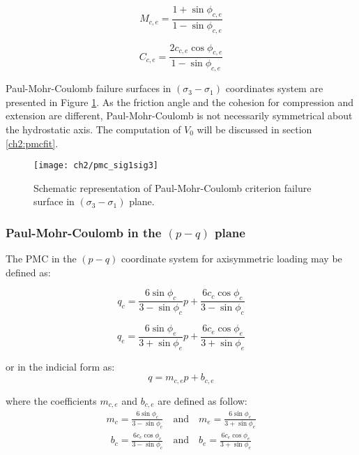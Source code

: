 \begin{equation}\label{eq2:PMC_sig1sig3_Mce}
    M_{c,e} = \frac{1+\sin \phi_{c,e}}{1-\sin \phi_{c,e}}
\end{equation}

\begin{equation}\label{eq2:PMC_sig1sig3_Cce}
    C_{c,e} = \frac{2c_{c,e}\cos \phi_{c,e}}{1-\sin \phi_{c,e}}
\end{equation}

Paul-Mohr-Coulomb failure surfaces in $(\sigma_3 -\sigma_1)$ coordinates system are presented in Figure \ref{fig2:pmc_sig1sig3}. As the friction angle and the cohesion for compression and extension are different, Paul-Mohr-Coulomb is not necessarily symmetrical about the hydrostatic axis. The computation of $V_0$ will be discussed in section \ref{ch2:pmcfit}. 

\begin{figure}[tb]
    \centering
    \texttt{[image: ch2/pmc\_sig1sig3]}
    \caption{Schematic representation of Paul-Mohr-Coulomb criterion failure surface in $(\sigma_3 -\sigma_1)$ plane.}
    \label{fig2:pmc_sig1sig3}
\end{figure} 

\subsubsection{Paul-Mohr-Coulomb in the \texorpdfstring{$(p-q)$}{p-q} plane}

The PMC in the $(p-q)$ coordinate system for axisymmetric loading may be defined as:

\begin{equation}\label{eq2:pmc-q-CTC}
    q_c=\frac{6 \sin \phi_{c}}{3-\sin \phi_{c}} p+\frac{6 c_{c} \cos \phi_{c}}{3-\sin \phi_{c}}
\end{equation}

\begin{equation}\label{eq2:pmc-q-CTE}
    q_e=\frac{6 \sin \phi_{e}}{3+\sin \phi_{e}} p+\frac{6 c_{e} \cos  \phi_{e}}{3+\sin \phi_{e}}
\end{equation}

or in the indicial form as:
\begin{equation}\label{eq2:PMC_pq}
    q = m_{c,e}p+b_{c,e}
\end{equation}

where the coefficients $m_{c,e}$ and $b_{c,e}$ are defined as follow:
\begin{align}\label{eq2:pmc_m_pq}
    m_c=\frac{6 \sin \phi_{c}}{3-\sin \phi_{c}} \quad \textrm{and} \quad m_e=\frac{6 \sin \phi_{e}}{3+\sin \phi_{e}} 
\end{align}
\begin{align}\label{eq2:pmc_b_pq}
    b_c=\frac{6 c_{c} \cos \phi_{c}}{3-\sin \phi_{c}}\quad \textrm{and} \quad b_e=\frac{6 c_{e} \cos \phi_{e}}{3+\sin \phi_{e}}
\end{align}

